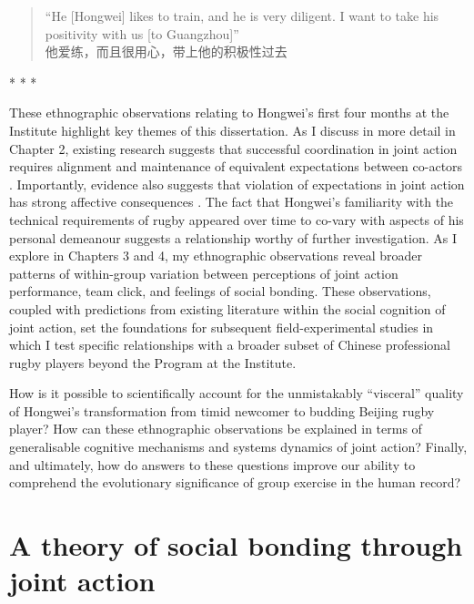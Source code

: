\begin{CJK}{UTF8}{gbsn}
  \begin{quotation}
``He [Hongwei] likes to train, and he is very diligent. I want to take his positivity with us [to Guangzhou]'' \\
他爱练，而且很用心，带上他的积极性过去
  \end{quotation}


\begin{center}
  * * *
\end{center}


These ethnographic observations relating to Hongwei's first four months at the Institute highlight key themes of this dissertation.  As I discuss in more detail in Chapter 2, existing research suggests that successful coordination in joint action requires alignment and maintenance of equivalent expectations between co-actors \citep{Sebanz2006,Vesper2017,Pesquita2017}.  Importantly, evidence also suggests that violation of expectations in joint action has strong affective consequences \citep{Chetverikov2016}.  The fact that Hongwei's familiarity with the technical requirements of rugby appeared over time to co-vary with aspects of his personal demeanour suggests a relationship worthy of further investigation.  As I explore in Chapters 3 and 4, my ethnographic observations reveal broader patterns of within-group variation between perceptions of joint action performance, team click, and feelings of social bonding.  These observations, coupled with predictions from existing literature within the social cognition of joint action, set the foundations for subsequent field-experimental studies in which I test specific relationships with a broader subset of Chinese professional rugby players beyond the Program at the Institute.

How is it possible to scientifically account for the unmistakably ``visceral'' quality of Hongwei's transformation from timid newcomer to budding Beijing rugby player? How can these ethnographic observations be explained in terms of generalisable cognitive mechanisms and systems dynamics of joint action?  Finally, and ultimately, how do answers to these questions improve our ability to comprehend the evolutionary significance of group exercise in the human record?



\section{A theory of social bonding through joint action}



\end{CJK}
